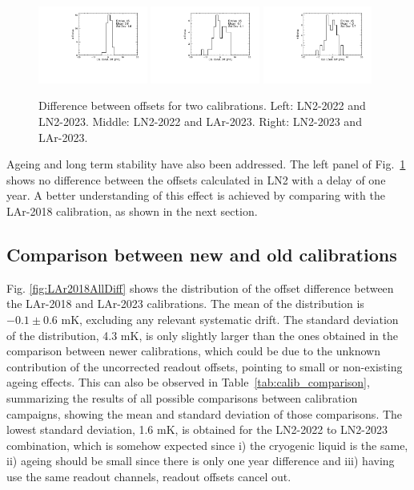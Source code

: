 \begin{figure}[htbp]
\centering
{\includegraphics[width=0.32\textwidth]{images/figure_21_a.pdf}}
{\includegraphics[width=0.32\textwidth]{images/figure_21_b.pdf}}
{\includegraphics[width=0.32\textwidth]{images/figure_21_c.pdf}}
\caption{Difference between offsets for two calibrations. Left: LN2-2022 and LN2-2023. Middle: LN2-2022 and LAr-2023. Right:  LN2-2023 and LAr-2023.}
\label{fig:comp_newCalib}
\end{figure}

Ageing and long term stability have also been addressed. The left panel of Fig.~\ref{fig:comp_newCalib} shows no difference between the offsets calculated in LN2 with a delay of one year. A better understanding of this effect is achieved by comparing with the LAr-2018 calibration, as shown in the next section.

\subsection{Comparison between new and old calibrations}
\label{sec:compNewOld}

\noindent Fig. \ref{fig:LAr2018AllDiff} shows the distribution of the offset difference between the LAr-2018 and LAr-2023 calibrations. The mean of the distribution is $-0.1\pm0.6$ mK, excluding any relevant systematic drift. The standard deviation of the distribution, 4.3 mK, is only slightly larger than the ones obtained in the comparison between newer calibrations, which could be due to the unknown contribution of the uncorrected readout offsets, pointing to small or non-existing ageing effects. This can also be observed in Table~\ref{tab:calib_comparison}, summarizing the results of all possible comparisons between calibration campaigns, showing the mean and standard deviation of those comparisons. The lowest standard deviation, 1.6 mK, is obtained for the LN2-2022 to LN2-2023 combination, which is somehow expected since i) the cryogenic liquid is the same, ii) ageing should be small since there is only one year difference and iii) having use the same readout channels, readout offsets cancel out.


